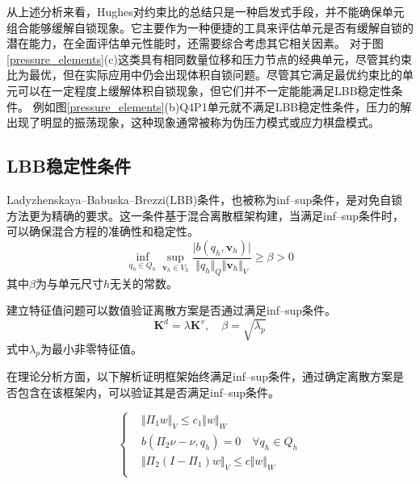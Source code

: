 从上述分析来看，Hughes对约束比的总结只是一种启发式手段，并不能确保单元组合能够缓解自锁现象。它主要作为一种便捷的工具来评估单元是否有缓解自锁的潜在能力，在全面评估单元性能时，还需要综合考虑其它相关因素。
对于图\ref{pressure_elements}(c)这类具有相同数量位移和压力节点的经典单元，尽管其约束比为最优，但在实际应用中仍会出现体积自锁问题。尽管其它满足最优约束比的单元可以在一定程度上缓解体积自锁现象，但它们并不一定能能满足LBB稳定性条件。
例如图\ref{pressure_elements}(b)Q4P1单元就不满足LBB稳定性条件，压力的解出现了明显的振荡现象，这种现象通常被称为伪压力模式或应力棋盘模式。
\subsection{LBB稳定性条件}
Ladyzhenskaya--Babuska--Brezzi(LBB)条件，也被称为inf--sup条件\cite{babuska1997a,bathe1996}，是对免自锁方法更为精确的要求。这一条件基于混合离散框架构建，当满足inf--sup条件时，可以确保混合方程的准确性和稳定性。
\begin{equation}\label{infsup}
    \inf_{q_h \in Q_h} \sup_{\boldsymbol v_h \in V_h} \frac{\vert b(q_h,\boldsymbol v_h) \vert}{\Vert q_h \Vert_Q \Vert \boldsymbol v_h \Vert_V} \ge \beta > 0
\end{equation}
其中$\beta$为与单元尺寸$h$无关的常数。

建立特征值问题\cite{chapelle1993}可以数值验证离散方案是否通过满足inf--sup条件。
\begin{equation}\label{eigenvalue}
    \boldsymbol K^d=\lambda\boldsymbol K^v,\quad \beta=\sqrt{\lambda_p}
\end{equation}
式中$\lambda_p$为最小非零特征值。

在理论分析方面，以下解析证明框架\cite{chapelle1993}始终满足inf--sup条件，通过确定离散方案是否包含在该框架内，可以验证其是否满足inf--sup条件。

\begin{equation}\label{analy}
    \begin{cases}
        &\Vert\Pi_1 w\Vert_V \le c_1\Vert w\Vert_W \\
        &b(\Pi_2\nu-\nu,q_h)=0 \quad \forall q_h \in Q_h\\
        &\Vert \Pi_2(I-\Pi_1)w \Vert_V \le c \Vert w\Vert_W \\
    \end{cases}
\end{equation}


